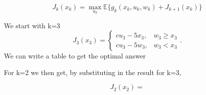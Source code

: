 \documentclass{article}
\begin{document}
\begin{equation}
	J_k(x_k) = \max_{u_k} \mathbb{E} \lbrace g_k(x_k,u_k,w_k) + J_{k+1}(x_k) \rbrace
\end{equation}

We start with k=3
\begin{equation}
	J_3(x_3) = 	 \begin{cases}
		c u_3 - 5x_3, & w_3 \geq x_3\\
		c u_3 - 5w_3, & w_3 < x_3
	\end{cases} .
\end{equation}
We can write a table to get the optimal answer

For k=2 we then get, by substituting in the result for k=3,

\begin{equation}
	J_2(x_2) = 
\end{equation}
\end{document}
